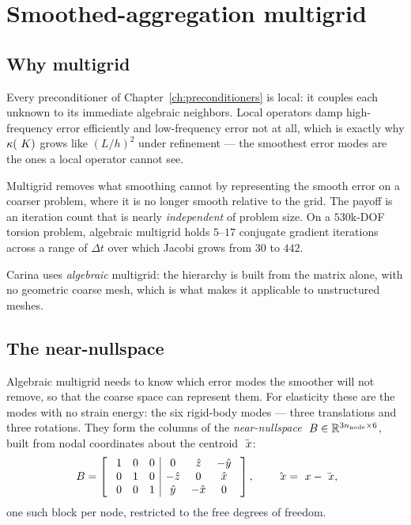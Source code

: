 \chapter{Smoothed-aggregation multigrid}
\label{ch:amg}

\section{Why multigrid}

Every preconditioner of Chapter~\ref{ch:preconditioners} is local: it couples
each unknown to its immediate algebraic neighbors.  Local operators damp
high-frequency error efficiently and low-frequency error not at all, which is
exactly why $\kappa(~K)$ grows like $(L/h)^2$ under refinement --- the
smoothest error modes are the ones a local operator cannot see.

Multigrid removes what smoothing cannot by representing the smooth error on a
coarser problem, where it is no longer smooth relative to the grid.  The payoff
is an iteration count that is nearly \emph{independent} of problem size.  On
a $530$k-DOF torsion problem, algebraic multigrid holds $5$--$17$ conjugate
gradient iterations across a range of $\Delta t$ over which Jacobi grows from
$30$ to $442$.

Carina uses \emph{algebraic} multigrid: the hierarchy is built from the matrix
alone, with no geometric coarse mesh, which is what makes it applicable to
unstructured meshes.

\section{The near-nullspace}
\label{sec:nullspace}

Algebraic multigrid needs to know which error modes the smoother will not
remove, so that the coarse space can represent them.  For elasticity these are
the modes with no strain energy: the six rigid-body modes --- three
translations and three rotations.  They form the columns of the
\emph{near-nullspace} $~B \in \mathbb{R}^{3n_{\mathrm{node}} \times 6}$,
built from nodal coordinates about the centroid $\bar{~x}$:
\begin{equation}
  ~B = \left[\
  \begin{array}{ccc|ccc}
    1 & 0 & 0 & 0     & \hat{z}  & -\hat{y} \\
    0 & 1 & 0 & -\hat{z} & 0     & \hat{x}  \\
    0 & 0 & 1 & \hat{y}  & -\hat{x} & 0
  \end{array}\ \right],
  \qquad \hat{~x} = ~x - \bar{~x},
\end{equation}
one such block per node, restricted to the free degrees of freedom.


